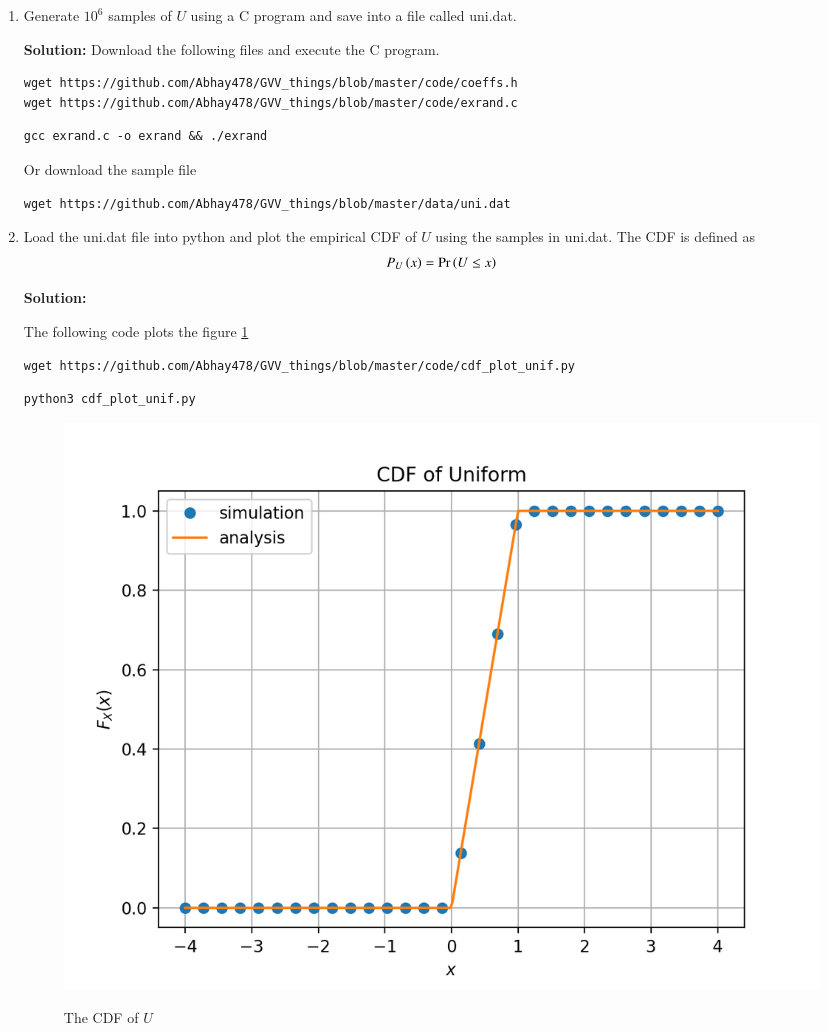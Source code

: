 \documentclass[journal,12pt,twocolumn]{IEEEtran}
\renewcommand\thesection{\arabic{section}}
\providecommand{\pr}[1]{\ensuremath{\Pr\left(#1\right)}}
\theoremstyle{remark}
\newcommand{\solution}{\noindent \textbf{Solution: }}
\numberwithin{equation}{section}
\numberwithin{equation}{section}
\begin{document}
\begin{enumerate}[label=\thesection.\arabic*,ref=\thesection.\theenumi]
\item Generate $10^6$ samples of $U$ using a C program and save into a file called uni.dat.

\solution Download the following files and execute the C program.

\begin{lstlisting}
wget https://github.com/Abhay478/GVV_things/blob/master/code/coeffs.h
wget https://github.com/Abhay478/GVV_things/blob/master/code/exrand.c
\end{lstlisting}
    
    \begin{lstlisting}
gcc exrand.c -o exrand && ./exrand
    \end{lstlisting}

Or download the sample file
\begin{lstlisting}
wget https://github.com/Abhay478/GVV_things/blob/master/data/uni.dat   
\end{lstlisting}

%
\item
Load the uni.dat file into python and plot the empirical CDF of $U$ using the samples in uni.dat. The CDF is defined as
\begin{align}
    \cdf{x}{U} = \pr{U \le x}
\end{align}

\solution  

The following code plots the figure \ref{fig:uni_cdf}
\begin{lstlisting}
wget https://github.com/Abhay478/GVV_things/blob/master/code/cdf_plot_unif.py
\end{lstlisting}

\begin{lstlisting}
python3 cdf_plot_unif.py
\end{lstlisting}

\begin{figure}[!h]
    \centering
    \caption{The CDF of $U$}
    \includegraphics[width=\columnwidth]{unif.png}
        \label{fig:uni_cdf}
\end{figure}


\end{enumerate}
\end{document}
